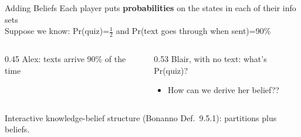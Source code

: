 

\begin{frame}{Adding Beliefs}
Each player puts \textbf{probabilities} on the states in each of their info sets\\
Suppose we know: Pr(quiz)=$\tfrac12$ and Pr(text goes through when sent)=90\%
\centering
{}
\bsk
\raggedright
\begin{columns}[T]
\begin{column}{0.45\textwidth}
Alex: texts arrive 90\% of the time
\end{column}
\begin{column}{0.53\textwidth}
Blair, with no text: what's Pr(quiz)?
\begin{itemize}
    \item How can we derive her belief??
\end{itemize}
\end{column}
\end{columns}
\vfill
{\footnotesize Interactive knowledge-belief structure (Bonanno Def.~9.5.1): partitions plus beliefs.}
\vspace{-0.2in}
\end{frame}

